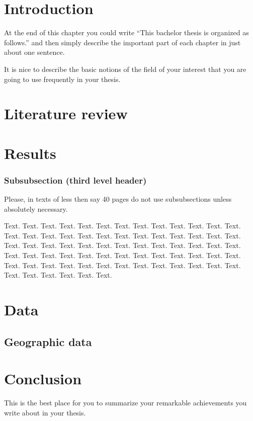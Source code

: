 
\section*{Introduction}
\par At the end of this chapter you could write ``This bachelor thesis is organized as follows.'' and then
simply describe the important part of each chapter in just about one sentence.

\par It is nice to describe the basic notions of the field of your interest that you are going to use frequently in your thesis.

\newpage
\section{Literature review}


\section{Results}





\subsubsection{Subsubsection (third level header)}

\par Please, in texts of less then say 40 pages do not use subsubsections unless absolutely necessary.
\par Text. Text. Text. Text. Text. Text. Text. Text. Text. Text. Text. Text. Text. Text. Text. Text.
Text. Text. Text. Text. Text. Text. Text. Text. Text. Text. Text.
Text. Text. Text. Text. Text. Text. Text. Text. Text. Text. Text.
Text. Text. Text. Text. Text. Text. Text. Text. Text. Text. Text.
Text. Text. Text. Text. Text. Text. Text. Text. Text. Text. Text.
Text. Text. Text. Text. Text. Text. Text. Text. Text. Text. Text.


\newpage
\section{Data}


\subsection{Geographic data}

\newpage

\section*{Conclusion}




This is the best place for you to summarize your remarkable
achievements you write about in your thesis.
